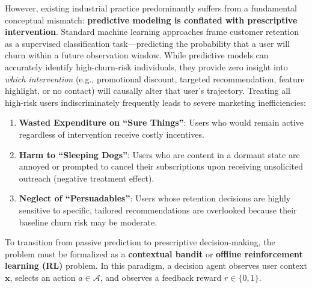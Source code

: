 \documentclass[preprint,12pt,3p]{elsarticle}
\begin{document}
However, existing industrial practice predominantly suffers from a fundamental conceptual mismatch: \textbf{predictive modeling is conflated with prescriptive intervention}. Standard machine learning approaches frame customer retention as a supervised classification task---predicting the probability that a user will churn within a future observation window. While predictive models can accurately identify high-churn-risk individuals, they provide zero insight into \textit{which intervention} (e.g., promotional discount, targeted recommendation, feature highlight, or no contact) will causally alter that user's trajectory. Treating all high-risk users indiscriminately frequently leads to severe marketing inefficiencies:
\begin{enumerate}
    \item \textbf{Wasted Expenditure on ``Sure Things''}: Users who would remain active regardless of intervention receive costly incentives.
    \item \textbf{Harm to ``Sleeping Dogs''}: Users who are content in a dormant state are annoyed or prompted to cancel their subscriptions upon receiving unsolicited outreach (negative treatment effect).
    \item \textbf{Neglect of ``Persuadables''}: Users whose retention decisions are highly sensitive to specific, tailored recommendations are overlooked because their baseline churn risk may be moderate.
\end{enumerate}

To transition from passive prediction to prescriptive decision-making, the problem must be formalized as a \textbf{contextual bandit} or \textbf{offline reinforcement learning (RL)} problem. In this paradigm, a decision agent observes user context $\mathbf{x}$, selects an action $a \in \mathcal{A}$, and observes a feedback reward $r \in \{0, 1\}$.
\end{document}
